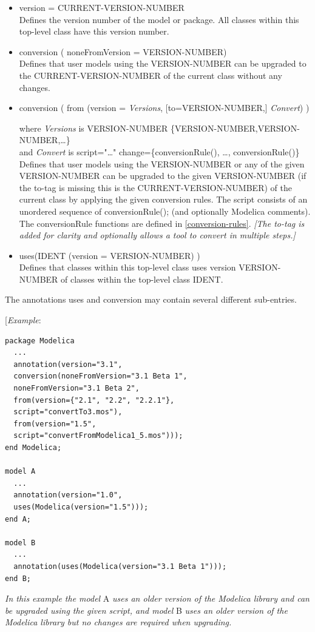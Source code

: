 \documentclass[10pt,a4paper]{report}
\begin{document}
\begin{itemize}
\item
  version = CURRENT-VERSION-NUMBER\\
  Defines the version number of the model or package. All classes within
  this top-level class have this version number.
\item
  conversion ( noneFromVersion = VERSION-NUMBER)\\
  Defines that user models using the VERSION-NUMBER can be upgraded to
  the CURRENT-VERSION-NUMBER of the current class without any changes.
\item
  conversion ( from (version = \emph{Versions}, {[}to=VERSION-NUMBER,{]}
  \emph{Convert}) )

  where \emph{Versions} is VERSION-NUMBER \textbar{}
  \{VERSION-NUMBER,VERSION-NUMBER,\ldots{}\}\\
  and \emph{Convert} is script="\ldots{}" \textbar{}
  change=\{conversionRule(), \ldots{}, conversionRule()\}\\
  Defines that user models using the VERSION-NUMBER or any of the given
  VERSION-NUMBER can be upgraded to the given VERSION-NUMBER (if the
  to-tag is missing this is the CURRENT-VERSION-NUMBER) of the current
  class by applying the given conversion rules. The script consists of
  an unordered sequence of conversionRule(); (and optionally Modelica
  comments). The conversionRule functions are defined in \ref{conversion-rules}.
  \emph{{[}The to-tag is added for clarity and optionally allows a tool
  to convert in multiple steps.{]}}
\item
  uses(IDENT (version = VERSION-NUMBER) )\\
  Defines that classes within this top-level class uses version
  VERSION-NUMBER of classes within the top-level class IDENT.
\end{itemize}

The annotations uses and conversion may contain several different
sub-entries.

{[}\emph{Example}:

\begin{lstlisting}[language=modelica]
package Modelica
  ...
  annotation(version="3.1",
  conversion(noneFromVersion="3.1 Beta 1",
  noneFromVersion="3.1 Beta 2",
  from(version={"2.1", "2.2", "2.2.1"},
  script="convertTo3.mos"),
  from(version="1.5",
  script="convertFromModelica1_5.mos")));
end Modelica;

model A
  ...
  annotation(version="1.0",
  uses(Modelica(version="1.5")));
end A;

model B
  ...
  annotation(uses(Modelica(version="3.1 Beta 1")));
end B;
\end{lstlisting}
\emph{In this example the model} A \emph{uses an older version of the
Modelica library and can be upgraded using the given script, and model}
B \emph{uses an older version of the Modelica library but no changes are
required when upgrading. }
\end{document}
